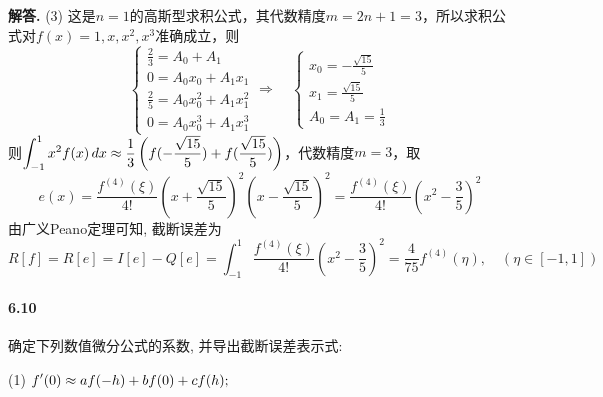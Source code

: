 \documentclass[12pt, a4paper, oneside]{ctexart}
\newenvironment{solution}{\par\noindent\textbf{解答. }}{\bigskip\par}
\begin{document}
\begin{solution}
    (3) 这是$n=1$的高斯型求积公式，其代数精度$m  =2n+1 = 3$，所以求积公式对$f(x) = 1,x,x^2,x^3$准确成立，则
    \begin{equation*}
        \begin{cases}
            \frac{2}{3} = A_0+A_1\\
            0=A_0x_0+A_1x_1\\
            \frac{2}{5} = A_0x_0^2+A_1x_1^2\\
            0 = A_0x_0^3+A_1x_1^3
        \end{cases}\Rightarrow\quad \begin{cases}
            x_0 = -\frac{\sqrt{15}}{5}\\
            x_1 = \frac{\sqrt{15}}{5}\\
            A_0 = A_1 = \frac{1}{3}
        \end{cases}
    \end{equation*}
    则$\displaystyle \int_{-1}^1x^2f(x)\,dx \approx \frac{1}{3}\left(f(-\frac{\sqrt{15}}{5})+f(\frac{\sqrt{15}}{5})\right)$，代数精度$m=3$，取
    \begin{equation*}
    e(x) = \frac{f^{(4)}(\xi)}{4!}(x+\frac{\sqrt{15}}{5})^2(x-\frac{\sqrt{15}}{5})^2 = \frac{f^{(4)}(\xi)}{4!}(x^2-\frac{3}{5})^2
    \end{equation*}
    由广义Peano定理可知, 截断误差为
    \begin{equation*}
        R[f] = R[e] = I[e] - Q[e] = \int_{-1}^1\frac{f^{(4)}{(\xi)}}{4!}(x^2-\frac{3}{5})^2=\frac{4}{75}f^{(4)}(\eta),\quad(\eta\in[-1,1])
    \end{equation*}
\end{solution}
\paragraph{6.10}确定下列数值微分公式的系数, 并导出截断误差表示式:

(1) $\displaystyle f'(0)\approx af(-h)+bf(0)+cf(h);$
\end{document}
